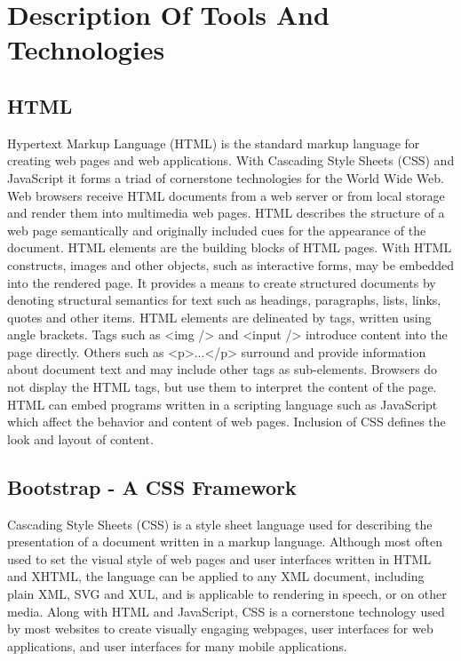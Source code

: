 \chapter{Description Of Tools And Technologies}

\section{HTML}
Hypertext Markup Language (HTML) is the standard markup language for creating web pages and web applications. With Cascading Style Sheets (CSS) and JavaScript it forms a triad of cornerstone technologies for the World Wide Web. Web browsers receive HTML documents from a web server or from local storage and render them into multimedia web pages. HTML describes the structure of a web page semantically and originally included cues for the appearance of the document.
HTML elements are the building blocks of HTML pages. With HTML constructs, images and other objects, such as interactive forms, may be embedded into the rendered page. It provides a means to create structured documents by denoting structural semantics for text such as headings, paragraphs, lists, links, quotes and other items. HTML elements are delineated by tags, written using angle brackets. Tags such as <img /> and <input /> introduce content into the page directly. Others such as <p>...</p> surround and provide information about document text and may include other tags as sub-elements. Browsers do not display the HTML tags, but use them to interpret the content of the page.
HTML can embed programs written in a scripting language such as JavaScript which affect the behavior and content of web pages. Inclusion of CSS defines the look and layout of content. 

\section{Bootstrap - A CSS Framework}
Cascading Style Sheets (CSS) is a style sheet language used for describing the presentation of a document written in a markup language. Although most often used to set the visual style of web pages and user interfaces written in HTML and XHTML, the language can be applied to any XML document, including plain XML, SVG and XUL, and is applicable to rendering in speech, or on other media. Along with HTML and JavaScript, CSS is a cornerstone technology used by most websites to create visually engaging webpages, user interfaces for web applications, and user interfaces for many mobile applications.

